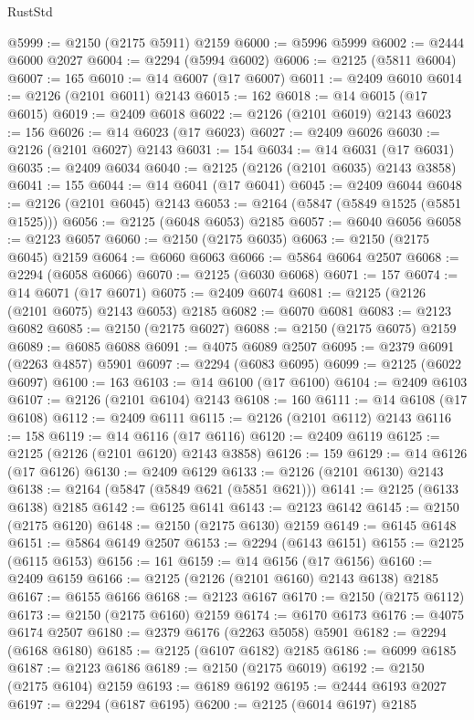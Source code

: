 \begin{lexlean}{RustStd}
\begin{coremodule}
@5999 := @2150 (@2175 @5911) @2159
@6000 := @5996 @5999
@6002 := @2444 @6000 @2027
@6004 := @2294 (@5994 @6002)
@6006 := @2125 (@5811 @6004)
@6007 := 165
@6010 := @14 @6007 (@17 @6007)
@6011 := @2409 @6010
@6014 := @2126 (@2101 @6011) @2143
@6015 := 162
@6018 := @14 @6015 (@17 @6015)
@6019 := @2409 @6018
@6022 := @2126 (@2101 @6019) @2143
@6023 := 156
@6026 := @14 @6023 (@17 @6023)
@6027 := @2409 @6026
@6030 := @2126 (@2101 @6027) @2143
@6031 := 154
@6034 := @14 @6031 (@17 @6031)
@6035 := @2409 @6034
@6040 := @2125 (@2126 (@2101 @6035) @2143 @3858)
@6041 := 155
@6044 := @14 @6041 (@17 @6041)
@6045 := @2409 @6044
@6048 := @2126 (@2101 @6045) @2143
@6053 := @2164 (@5847 (@5849 @1525 (@5851 @1525)))
@6056 := @2125 (@6048 @6053) @2185
@6057 := @6040 @6056
@6058 := @2123 @6057
@6060 := @2150 (@2175 @6035)
@6063 := @2150 (@2175 @6045) @2159
@6064 := @6060 @6063
@6066 := @5864 @6064 @2507
@6068 := @2294 (@6058 @6066)
@6070 := @2125 (@6030 @6068)
@6071 := 157
@6074 := @14 @6071 (@17 @6071)
@6075 := @2409 @6074
@6081 := @2125 (@2126 (@2101 @6075) @2143 @6053) @2185
@6082 := @6070 @6081
@6083 := @2123 @6082
@6085 := @2150 (@2175 @6027)
@6088 := @2150 (@2175 @6075) @2159
@6089 := @6085 @6088
@6091 := @4075 @6089 @2507
@6095 := @2379 @6091 (@2263 @4857) @5901
@6097 := @2294 (@6083 @6095)
@6099 := @2125 (@6022 @6097)
@6100 := 163
@6103 := @14 @6100 (@17 @6100)
@6104 := @2409 @6103
@6107 := @2126 (@2101 @6104) @2143
@6108 := 160
@6111 := @14 @6108 (@17 @6108)
@6112 := @2409 @6111
@6115 := @2126 (@2101 @6112) @2143
@6116 := 158
@6119 := @14 @6116 (@17 @6116)
@6120 := @2409 @6119
@6125 := @2125 (@2126 (@2101 @6120) @2143 @3858)
@6126 := 159
@6129 := @14 @6126 (@17 @6126)
@6130 := @2409 @6129
@6133 := @2126 (@2101 @6130) @2143
@6138 := @2164 (@5847 (@5849 @621 (@5851 @621)))
@6141 := @2125 (@6133 @6138) @2185
@6142 := @6125 @6141
@6143 := @2123 @6142
@6145 := @2150 (@2175 @6120)
@6148 := @2150 (@2175 @6130) @2159
@6149 := @6145 @6148
@6151 := @5864 @6149 @2507
@6153 := @2294 (@6143 @6151)
@6155 := @2125 (@6115 @6153)
@6156 := 161
@6159 := @14 @6156 (@17 @6156)
@6160 := @2409 @6159
@6166 := @2125 (@2126 (@2101 @6160) @2143 @6138) @2185
@6167 := @6155 @6166
@6168 := @2123 @6167
@6170 := @2150 (@2175 @6112)
@6173 := @2150 (@2175 @6160) @2159
@6174 := @6170 @6173
@6176 := @4075 @6174 @2507
@6180 := @2379 @6176 (@2263 @5058) @5901
@6182 := @2294 (@6168 @6180)
@6185 := @2125 (@6107 @6182) @2185
@6186 := @6099 @6185
@6187 := @2123 @6186
@6189 := @2150 (@2175 @6019)
@6192 := @2150 (@2175 @6104) @2159
@6193 := @6189 @6192
@6195 := @2444 @6193 @2027
@6197 := @2294 (@6187 @6195)
@6200 := @2125 (@6014 @6197) @2185

\end{coremodule}
\end{lexlean}
